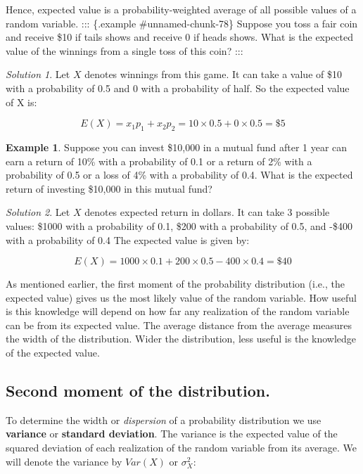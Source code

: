 \documentclass[
]{book}
\theoremstyle{definition}
\theoremstyle{definition}
\newtheorem{example}{Example}[chapter]
\theoremstyle{definition}
\theoremstyle{definition}
\theoremstyle{remark}
\newtheorem*{solution}{Solution}
\begin{document}
Hence, expected value is a probability-weighted average of all possible values of a random variable.
::: \{.example \#unnamed-chunk-78\}
Suppose you toss a fair coin and receive \$10 if tails shows and receive 0 if heads shows. What is the expected value of the winnings from a single toss of this coin?
:::

\begin{solution}
Let \(X\) denotes winnings from this game. It can take a value of \$10 with a probability of 0.5 and 0 with a probability of half. So the expected value of X is:

\[E(X) = x_1 p_1+x_2 p_2=10\times 0.5 + 0\times 0.5=\$5\]
\end{solution}

\begin{example}
\protect\hypertarget{exm:unnamed-chunk-80}{}\label{exm:unnamed-chunk-80}Suppose you can invest \$10,000 in a mutual fund after 1 year can earn a return of 10\%
with a probability of 0.1 or a return of 2\% with a probability of 0.5 or a loss of 4\% with a probability of 0.4. What is the expected return of investing \$10,000 in this mutual fund?
\end{example}

\begin{solution}
Let \(X\) denotes expected return in dollars. It can take 3 possible values: \$1000 with a probability of 0.1, \$200 with a probability of 0.5, and -\$400 with a probability of 0.4 The expected value is given by:

\[E(X) = 1000\times 0.1 + 200 \times 0.5 - 400 \times 0.4=\$40 \]
\end{solution}

As mentioned earlier, the first moment of the probability distribution (i.e., the expected value) gives us the most likely value of the random variable. How useful is this knowledge will depend on how far any realization of the random variable can be from its expected value. The average distance from the average measures the width of the distribution. Wider the distribution, less useful is the knowledge of the expected value.

\hypertarget{second-moment-of-the-distribution.}{%
\subsection{Second moment of the distribution.}\label{second-moment-of-the-distribution.}}

To determine the width or \emph{dispersion} of a probability distribution we use \textbf{variance} or \textbf{standard deviation}. The variance is the expected value of the squared deviation of each realization of the random variable from its average. We will denote the variance by \(Var(X)\) or \(\sigma^2_X\):
\end{document}
